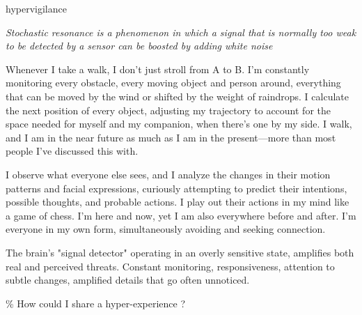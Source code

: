



\begin{center}
\vspace*{\fill}
\Huge hypervigilance

\vspace{2cm}

\begin{flushright}
\large
\textit{Stochastic resonance is a phenomenon in which a signal that is normally too weak to be detected by a sensor can be boosted by adding white noise}
\end{flushright}
\vspace*{\fill}
\end{center}

\normalsize

Whenever I take a walk, I don't just stroll from A to B. I'm constantly monitoring every obstacle, every moving object and person around, everything that can be moved by the wind or shifted by the weight of raindrops. I calculate the next position of every object, adjusting my trajectory to account for the space needed for myself and my companion, when there's one by my side. I walk, and I am in the near future as much as I am in the present—more than most people I've discussed this with.

I observe what everyone else sees, and I analyze the changes in their motion patterns and facial expressions, curiously attempting to predict their intentions, possible thoughts, and probable actions. I play out their actions in my mind like a game of chess. I'm here and now, yet I am also everywhere before and after. I'm everyone in my own form, simultaneously avoiding and seeking connection.

The brain’s "signal detector" operating in an overly sensitive state, amplifies both real and perceived threats. Constant monitoring, responsiveness, attention to subtle changes, amplified details that go often unnoticed. 

{\scriptsize \textcolor{comment}{\%  How could I share a hyper-experience ?}}

\citep{wiesenfeld1995}




